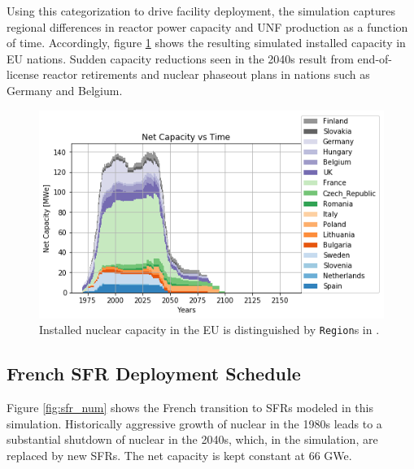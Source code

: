 Using this categorization to drive facility deployment, the simulation captures 
regional differences in reactor power capacity and \gls{UNF} production as a 
function of time. Accordingly, figure \ref{fig:eu_pow} shows the resulting simulated 
installed capacity in \gls{EU} nations.  Sudden capacity reductions seen in the 
2040s result from end-of-license reactor retirements and nuclear phaseout plans 
in nations such as Germany and Belgium.
    
\begin{figure}[htbp!]
    \begin{center}
        \includegraphics[scale=0.6]{./images/eu_future/power_plot.png}
    \end{center}
    \caption{Installed nuclear capacity in the EU is distinguished by \texttt{Region}s in \Cyclus.}
    \label{fig:eu_pow}
\end{figure}


\subsection{French \gls{SFR} Deployment Schedule}

Figure \ref{fig:sfr_num} shows
the French transition to \glspl{SFR} modeled in this simulation.
Historically aggressive growth of nuclear in the 1980s leads to a substantial 
shutdown of nuclear in the 2040s, which, in the simulation, are replaced by new 
\glspl{SFR}. The net capacity is kept constant at 66 GWe.

